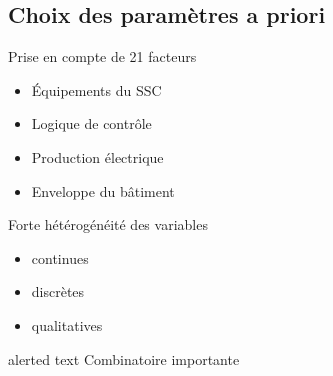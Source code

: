 \documentclass[xcolor=x11names, compress, 11pt]{beamer}
\newcommand{\addalert}[1]{%
\begin{beamercolorbox}[sep=2pt,center,shadow=true,rounded=true]{alerted text}
    #1\par%
\end{beamercolorbox}%
}
\begin{document}
\subsection{Choix des paramètres a priori}
\begin{frame}[c]
    \vfill
    \centering
    Prise en compte de \num{21} facteurs
    \begin{itemize}
        \item Équipements du SSC
        \item Logique de contrôle
        \item Production électrique
        \item Enveloppe du bâtiment
    \end{itemize}
    \vfill
    Forte hétérogénéité des variables
    \begin{itemize}
        \item continues
        \item discrètes
        \item qualitatives
    \end{itemize}
    \vfill
    \addalert{Combinatoire importante}
\end{frame}



\end{document}

